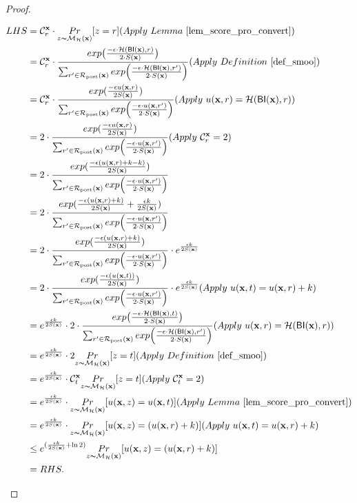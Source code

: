 \documentclass{article}
\begin{document}
\begin{proof}
\begin{itemize}
\begin{itemize}
      \begin{equation*}
      \begin{split}
      LHS 
      & = \cardinality{\dataobs}{r} \cdot \hexpmechPr{\dataobs}{z = r}     (Apply\ Lemma\ \ref{lem_score_pro_convert})\\
      & = \cardinality{\dataobs}{r} \cdot \frac {exp\big(\frac{-\epsilon\cdot\hellinger(\bysinfer(\dataobs),r)}{2\cdot S(\dataobs)}\big)}{\nomalizer{\dataobs}} 
      (Apply\ Definition\ \ref{def_smoo})\\
      & = \cardinality{\dataobs}{r} \cdot \frac{exp(\frac{-\epsilon \ux{r}}{2 S(\dataobs)})}{\unomalizer{\dataobs}}
      (Apply\ \ux{r} = \hellinger(\bysinfer(\dataobs), r))\\
      & = 2 \cdot \frac{exp(\frac{-\epsilon \ux{r}}{2 S(\dataobs)})}{\unomalizer{\dataobs}}                  (Apply\ \cardinality{\dataobs}{r} = 2)\\
      & = 2 \cdot \frac{exp(\frac{-\epsilon (\ux{r} + k - k)}{2 S(\dataobs)})}{\unomalizer{\dataobs}}\\
      & = 2 \cdot \frac{exp(\frac{-\epsilon (\ux{r} + k)}{2 S(\dataobs)} + \frac{\epsilon k}{2 S(\dataobs)})}{\unomalizer{\dataobs}}\\
      & = 2 \cdot \frac{exp(\frac{-\epsilon (\ux{r} + k)}{2 S(\dataobs)})}{\unomalizer{\dataobs}} \cdot e^{\frac{\epsilon k}{2 S(\dataobs)}}\\
      & = 2 \cdot \frac{exp(\frac{-\epsilon (\ux{t})}{2 S(\dataobs)})}{\unomalizer{\dataobs}} \cdot e^{\frac{\epsilon k}{2 S(\dataobs)}}  (Apply \ \ux{t} = \ux{r} + k)\\
      & = e^{\frac{\epsilon k}{2 S(\dataobs)}} \cdot 2 \cdot \frac {exp\big(\frac{-\epsilon\cdot\hellinger(\bysinfer(\dataobs), t)}{2\cdot S(\dataobs)}\big)}{\nomalizer{\dataobs}} 
      (Apply\ \ux{r} = \hellinger(\bysinfer(\dataobs), r))\\
      & = e^{\frac{\epsilon k}{2 S(\dataobs)}} \cdot 2 \hexpmechPr{\dataobs}{z = t}       (Apply\ Definition\ \ref{def_smoo})\\
      & = e^{\frac{\epsilon k}{2 S(\dataobs)}} \cdot \cardinality{\dataobs}{t} \hexpmechPr{\dataobs}{z = t}         (Apply \ \cardinality{\dataobs}{t} = 2)\\
      & = e^{\frac{\epsilon k}{2 S(\dataobs)}} \cdot \hexpmechPr{\dataobs}{\ux{z} = \ux{t}}               (Apply \ Lemma\ \ref{lem_score_pro_convert})\\
      & = e^{\frac{\epsilon k}{2 S(\dataobs)}} \cdot \hexpmechPr{\dataobs}{\ux{z} = (\ux{r} + k)}         (Apply \ \ux{t} = \ux{r} + k)\\
      & \leq e^{(\frac{\epsilon k}{2 S(\dataobs)} + \ln 2)} \hexpmechPr{\dataobs}{\ux{z} = (\ux{r} + k)}\\
      & = RHS.
      \end{split}
      \end{equation*}


\end{itemize}
\end{itemize}
\end{proof}
\end{document}
